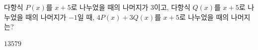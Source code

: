 다항식 $P(x)$를 $x+5$로 나누었을 때의 나머지가 $3$이고, 다항식 $Q(x)$를 $x+5$로 나누었을 때의 나머지가 $-1$일 때, $4P(x)+3Q(x)$를 $x+5$로 나누었을 때의 나머지는?
\begin{choices32}{$1$}{$3$}{$5$}{$7$}{$9$}\end{choices32}
